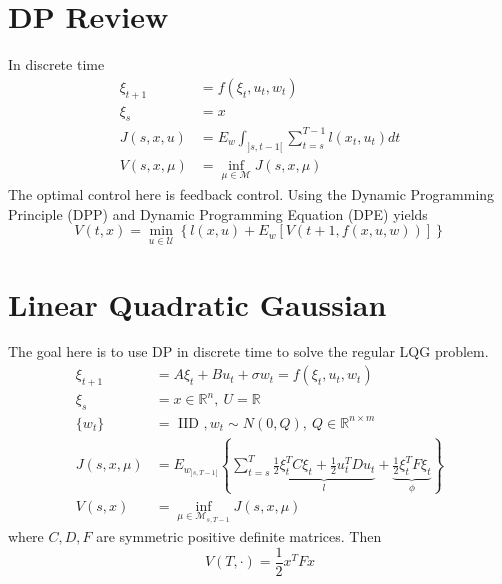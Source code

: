 \mainmatter%
\setcounter{page}{1}

\lectureseries[\course]{\course}

\date{October 13, 2009}

\setaddress%

\setcounter{lecture}{4}
\setcounter{chapter}{4}


\section{DP Review}
In discrete time
\begin{align*}
\xi_{t+1} &= f(\xi_t,u_t,w_t) \\
\xi_s &= x \\
J(s,x,u) &= E_w\int_{]s,t-1[}\sum_{t=s}^{T-1}l(x_t,u_t)dt \\%
V(s,x,\mu) &= \inf_{\mu\in\mathcal{M}}J(s,x,\mu)
\end{align*}
The optimal control here is feedback control.
Using the Dynamic Programming Principle (DPP) and Dynamic Programming Equation (DPE) yields
$$V(t,x) = \min_{u\in\mathcal{U}}\left\lbrace l(x,u) + E_w[V(t+1,f(x,u,w))]\right\rbrace$$

\section{Linear Quadratic Gaussian}
The goal here is to use DP in discrete time to solve the regular LQG problem.
\begin{align*}
\xi_{t+1} &= A\xi_t + Bu_t + \sigma w_t = f(\xi_t,u_t,w_t) \\
\xi_s &= x \in \mathbb{R}^n,~U=\mathbb{R} \\
\{w_t\} &= \text{~IID~}, w_t\sim N(0,Q),~Q\in\mathbb{R}^{n\times m} \\
J(s,x,\mu) &= E_{w_{]s,T-1[}} \left\lbrace \sum_{t=s}^T \underbrace{\frac{1}{2}\xi_t^T C \xi_t+\frac{1}{2}u_t^T Du_t}_{l} + \underbrace{\frac{1}{2}\xi_t^T F\xi_t}_{\phi} \right\rbrace \\%
V(s,x) &= \inf_{\mu\in\mathcal{M}_{s,T-1}}J(s,x,\mu)
\end{align*}
where $C,D,F$ are symmetric positive definite matrices.
Then
$$V(T,\cdot) = \frac{1}{2}x^T Fx$$

